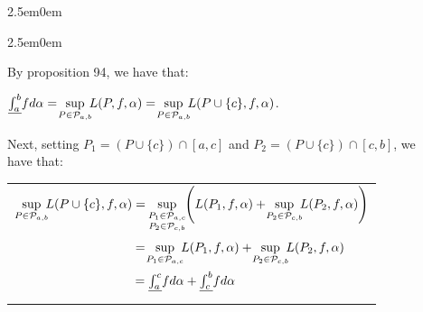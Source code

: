 \documentclass{book}
\newenvironment{myIndent}{%
   \begin{adjustwidth}{2.5em}{0em}%
}{%
   \end{adjustwidth}%
}
\newcommand{\retTwo}{\hfill\bigbreak}
\begin{document}
{\begin{myIndent}
\begin{enumerate}
{\begin{myIndent}
         By proposition 94, we have that:
         
         {\centering$\underline{\int_a^b}fd\alpha = \hspace{-0.2em}\sup\limits_{P \in \mathcal{P}_{a,b}}\hspace{-0.4em}L(P, f, \alpha) = \hspace{-0.2em}\sup\limits_{P \in \mathcal{P}_{a,b}}\hspace{-0.4em}L(P \cup \{c\}, f, \alpha)$.\retTwo\par}

         Next, setting $P_1 = \left(P \cup \{c\}\right) \cap [a, c]$ and $P_2 = \left(P \cup \{c\}\right) \cap [c, b]$, we\\ have that:

         {\centering
         \begin{tabular}{l}
            $\sup\limits_{P \in \mathcal{P}_{a,b}}\hspace{-0.4em}L(P \cup \{c\}, f, \alpha) = \hspace{-0.2em}\sup\limits_{
            \begin{smallmatrix}
               P_1 \in \mathcal{P}_{a,c}\\
               P_2 \in \mathcal{P}_{c,b}
            \end{smallmatrix}}\hspace{-0.4em}\left(L(P_1, f, \alpha) + \hspace{-0.2em}\sup\limits_{P_2 \in \mathcal{P}_{c,b}}\hspace{-0.4em}L(P_2, f, \alpha)\right)$\\ [32pt]

            $\phantom{\sup\limits_{P \in \mathcal{P}_{a,b}}\hspace{-0.4em}L(P \cup \{c\}, f, \alpha)} = \hspace{-0.2em}\sup\limits_{P_1 \in \mathcal{P}_{a,c}}\hspace{-0.4em}L(P_1, f, \alpha) + \hspace{-0.2em}\sup\limits_{P_2 \in \mathcal{P}_{c,b}}\hspace{-0.4em}L(P_2, f, \alpha)$\\ [16pt]

            $\phantom{\sup\limits_{P \in \mathcal{P}_{a,b}}\hspace{-0.4em}L(P \cup \{c\}, f, \alpha)} = \underline{\int_a^c}fd\alpha + \underline{\int_c^b}fd\alpha$\retTwo
         \end{tabular}\retTwo\par}
      \end{myIndent}}


\end{enumerate}
\end{myIndent}}
\end{document}
